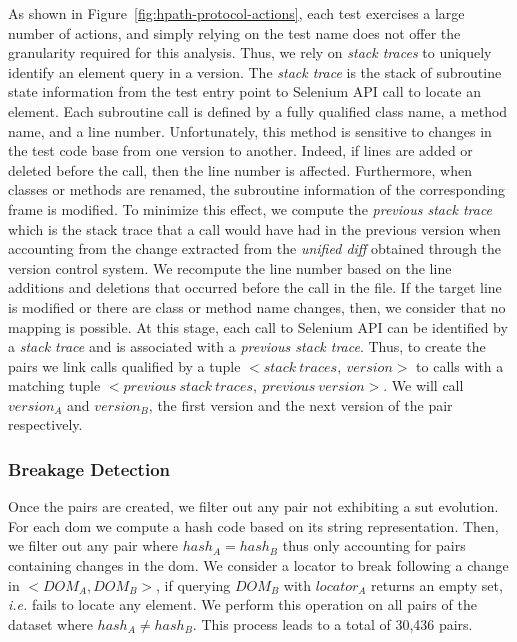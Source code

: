 As shown in Figure~\ref{fig:hpath-protocol-actions}, each test exercises a large number of actions, and simply relying on the test name does not offer the granularity required for this analysis. Thus, we rely on \emph{stack traces} to uniquely identify an element query in a version. The \emph{stack trace} is the stack of subroutine state information from the test entry point to Selenium API call to locate an element. Each subroutine call is defined by a fully qualified class name, a method name, and a line number. Unfortunately, this method is sensitive to changes in the test code base from one version to another. Indeed, if lines are added or deleted before the call, then the line number is affected. Furthermore, when classes or methods are renamed, the subroutine information of the corresponding frame is modified. To minimize this effect, we compute the \emph{previous stack trace} which is the stack trace that a call would have had in the previous version when accounting from the change extracted from the \emph{unified diff} obtained through the version control system. We recompute the line number based on the line additions and deletions that occurred before the call in the file. If the target line is modified or there are class or method name changes, then, we consider that no mapping is possible. At this stage, each call to Selenium API can be identified by a \emph{stack trace} and is associated with a \emph{previous stack trace}. Thus, to create the pairs we link calls qualified by a tuple $<stack\:traces,\:version>$ to calls with a matching tuple $<previous\:stack\:traces,\:previous\:version>$. We will call $version_A$ and $version_B$, the first version and the next version of the pair respectively.

\subsubsection{Breakage Detection}
\label{sec:hpath-protocol-breakage-detection}

Once the pairs are created, we filter out any pair not exhibiting a \gls{sut} evolution. For each \gls{dom} we compute a hash code based on its string representation. Then, we filter out any pair where $hash_A = hash_B$ thus only accounting for pairs containing changes in the \gls{dom}. We consider a locator to break following a change in $<DOM_A, DOM_B>$, if querying $DOM_B$ with $locator_A$ returns an empty set, \emph{i.e.} fails to locate any element. We perform this operation on all pairs of the dataset where $hash_A \neq hash_B$. This process leads to a total of 30,436 pairs.

